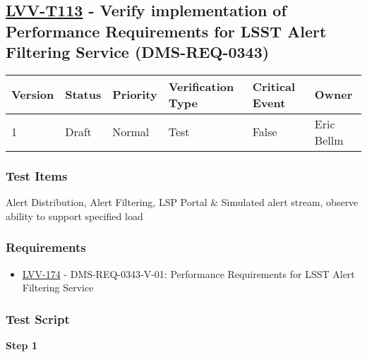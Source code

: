 \hypertarget{lvv-t113---verify-implementation-of-performance-requirements-for-lsst-alert-filtering-service-dms-req-0343}{%
\subsection{\texorpdfstring{\href{https://jira.lsstcorp.org/secure/Tests.jspa\#/testCase/LVV-T113}{LVV-T113}
- Verify implementation of Performance Requirements for LSST Alert
Filtering Service
(DMS-REQ-0343)}{LVV-T113 - Verify implementation of Performance Requirements for LSST Alert Filtering Service (DMS-REQ-0343)}}\label{lvv-t113---verify-implementation-of-performance-requirements-for-lsst-alert-filtering-service-dms-req-0343}}

\begin{longtable}[]{@{}llllll@{}}
\toprule
Version & Status & Priority & Verification Type & Critical Event &
Owner\tabularnewline
\midrule
\endhead
1 & Draft & Normal & Test & False & Eric Bellm\tabularnewline
\bottomrule
\end{longtable}

\hypertarget{test-items-89}{%
\subsubsection{Test Items}\label{test-items-89}}

Alert Distribution, Alert Filtering, LSP Portal \& Simulated alert
stream, observe ability to support specified load

\hypertarget{requirements-90}{%
\subsubsection{Requirements}\label{requirements-90}}

\begin{itemize}
\tightlist
\item
  \href{https://jira.lsstcorp.org/browse/LVV-174}{LVV-174} -
  DMS-REQ-0343-V-01: Performance Requirements for LSST Alert Filtering
  Service
\end{itemize}

\hypertarget{test-script-90}{%
\subsubsection{Test Script}\label{test-script-90}}

\textbf{Step 1}\\
~\\
~\\

